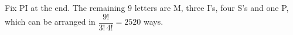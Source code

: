 Fix PI at the end. The remaining $9$ letters are M, three I's, four S's and one P, which can be arranged in $\dfrac{9!}{3!\,4!}=\boxed{2520}$ ways.
